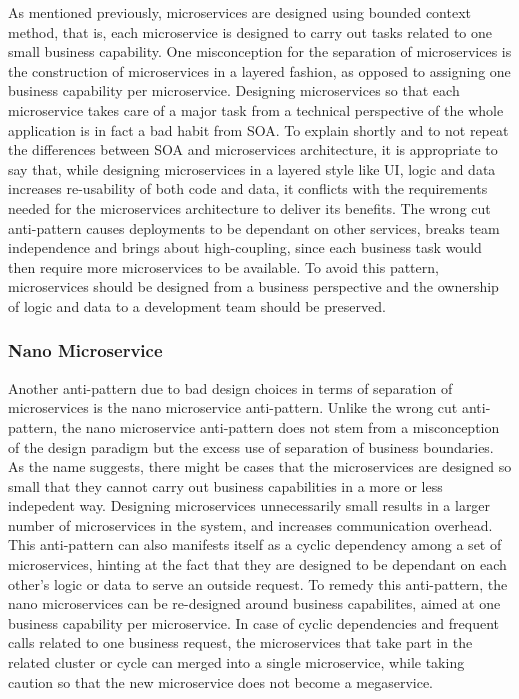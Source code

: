 \documentclass{Configuration_Files/PoliMi3i_thesis}
\begin{document}
As mentioned previously, microservices are designed using bounded context method, that is, each microservice is designed to carry out tasks related to one small business capability.
One misconception for the separation of microservices is the construction of microservices in a layered fashion, as opposed to assigning one business capability per microservice.
Designing microservices so that each microservice takes care of a major task from a technical perspective of the whole application is in fact a bad habit from SOA.
To explain shortly and to not repeat the differences between SOA and microservices architecture, it is appropriate to say that, while designing microservices in a layered style like UI, logic and data increases re-usability of both code and data, it conflicts with the requirements needed for the microservices architecture to deliver its benefits.
The wrong cut anti-pattern causes deployments to be dependant on other services, breaks team independence and brings about high-coupling, since each business task would then require more microservices to be available.
To avoid this pattern, microservices should be designed from a business perspective and the ownership of logic and data to a development team should be preserved.

\subsubsection{Nano Microservice}
\label{subsubsec:nano_microservice}

Another anti-pattern due to bad design choices in terms of separation of microservices is the nano microservice anti-pattern.
Unlike the wrong cut anti-pattern, the nano microservice anti-pattern does not stem from a misconception of the design paradigm but the excess use of separation of business boundaries.
As the name suggests, there might be cases that the microservices are designed so small that they cannot carry out business capabilities in a more or less indepedent way.
Designing microservices unnecessarily small results in a larger number of microservices in the system, and increases communication overhead.
This anti-pattern can also manifests itself as a cyclic dependency among a set of microservices, hinting at the fact that they are designed to be dependant on each other's logic or data to serve an outside request.
To remedy this anti-pattern, the nano microservices can be re-designed around business capabilites, aimed at one business capability per microservice.
In case of cyclic dependencies and frequent calls related to one business request, the microservices that take part in the related cluster or cycle can merged into a single microservice, while taking caution so that the new microservice does not become a megaservice.
\end{document}
